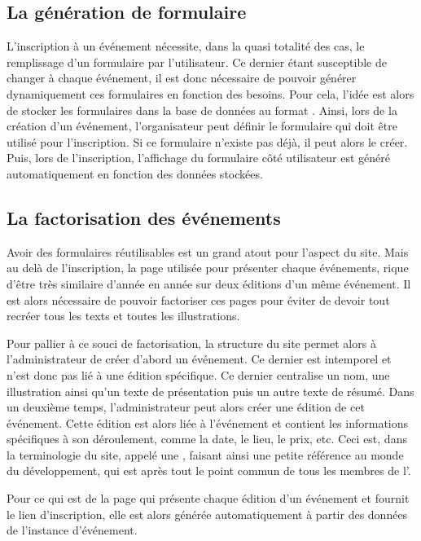 \subsection{La génération de formulaire}
\label{subsec:generation-formulaire}

L'inscription à un événement nécessite, dans la quasi totalité des cas, le remplissage d'un formulaire par l'utilisateur. Ce dernier étant susceptible de changer à chaque événement, il est donc nécessaire de pouvoir générer dynamiquement ces formulaires en fonction des besoins. Pour cela, l'idée est alors de stocker les formulaires dans la base de données au format . Ainsi, lors de la création d'un événement, l'organisateur peut définir le formulaire qui doit être utilisé pour l'inscription. Si ce formulaire n'existe pas déjà, il peut alors le créer. Puis, lors de l'inscription, l'affichage du formulaire côté utilisateur est généré automatiquement en fonction des données stockées.

\subsection{La factorisation des événements}
\label{subsec:factorisation-evenements}

Avoir des formulaires réutilisables est un grand atout pour l'aspect  du site. Mais au delà de l'inscription, la page utilisée pour présenter chaque événements, rique d'être très similaire d'année en année sur deux éditions d'un même événement. Il est alors nécessaire de pouvoir factoriser ces pages pour éviter de devoir tout recréer tous les texts et toutes les illustrations.
\bigskip

Pour pallier à ce souci de factorisation, la structure du site permet alors à l'administrateur de créer d'abord un événement. Ce dernier est intemporel et n'est donc pas lié à une édition spécifique. Ce dernier centralise un nom, une illustration ainsi qu'un texte de présentation puis un autre texte de résumé. Dans un deuxième temps, l'administrateur peut alors créer une édition de cet événement. Cette édition est alors liée à l'événement et contient les informations spécifiques à son déroulement, comme la date, le lieu, le prix, etc. Ceci est, dans la terminologie du site, appelé une , faisant ainsi une petite référence au monde du développement, qui est après tout le point commun de tous les membres de l'\ofni.

Pour ce qui est de la page qui présente chaque édition d'un événement et fournit le lien d'inscription, elle est alors générée automatiquement à partir des données de l'instance d'événement.
